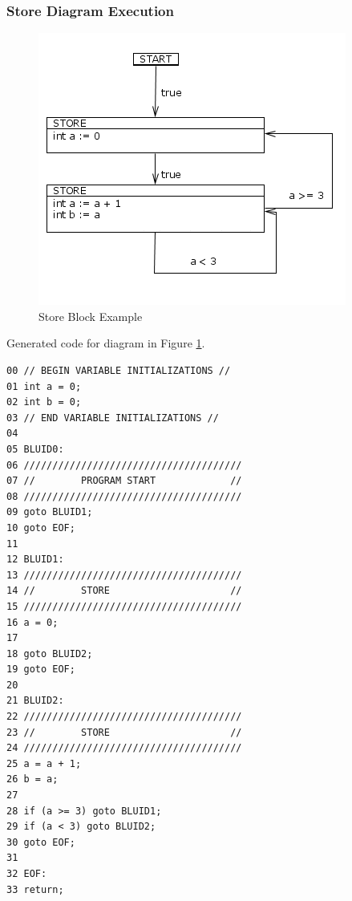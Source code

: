 \subsubsection{Store Diagram Execution}

\begin{figure}[h]
	\centering
	\includegraphics[width=\imgmedphoto]{./images/correctness_ex_store.png}
	\caption{Store Block Example}
	\label{fig:correctness_ex_store}
\end{figure}


Generated  code for diagram in Figure \ref{fig:correctness_ex_store}.
\begin{lstlisting}[frame=single]
00 // BEGIN VARIABLE INITIALIZATIONS //
01 int a = 0;
02 int b = 0;
03 // END VARIABLE INITIALIZATIONS //
04
05 BLUID0:
06 //////////////////////////////////////
07 //        PROGRAM START             //
08 //////////////////////////////////////
09 goto BLUID1;
10 goto EOF;
11
12 BLUID1:
13 //////////////////////////////////////
14 //        STORE                     //
15 //////////////////////////////////////
16 a = 0;
17 
18 goto BLUID2;
19 goto EOF;
20
21 BLUID2:
22 //////////////////////////////////////
23 //        STORE                     //
24 //////////////////////////////////////
25 a = a + 1;
26 b = a;
27
28 if (a >= 3) goto BLUID1;
29 if (a < 3) goto BLUID2;
30 goto EOF;
31
32 EOF:
33 return;
\end{lstlisting}



